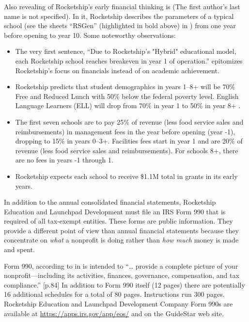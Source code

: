 Also revealing of Rocketship's early financial thinking is  \parencite{FinNarr2010} (The first author's last name is not specified). In it, Rocketship describes the parameters of a typical school (see the sheets ``RSGen'' (highlighted in bold above) in \textcite{RSED2009a}) from one year before opening to year 10. Some noteworthy observations:
\begin{itemize}
  \item The very first sentence, ``Due to Rocketship's "Hybrid" educational model, each Rocketship school reaches breakeven in year 1 of operation.'' \parencite[1]{FinNarr2010} epitomizes Rocketship's focus on financials instead of on academic achievement.
  \item Rocketship predicts that student demographics in years 1–8+ will be 70\% Free and Reduced Lunch with 50\% below the federal poverty level. English Language Learners (ELL) will drop from 70\% in year 1 to 50\% in year 8+ \parencite[1]{FinNarr2010}.
  \item The first seven schools are to pay 25\% of revenue (less food service sales and reimbursements) in management fees in the year before opening (year -1), dropping to 15\% in years 0–3+. Facilities fees start in year 1 and are 20\% of revenue (less food service sales and reimbursements). For schools 8+, there are no fees in years -1 through 1.\parencite[6]{FinNarr2010}

  \item Rocketship expects each school to receive \$1.1M total in grants in its early years.
\end{itemize}

In addition to the annual consolidated financial statements, Rocketship Education and Launchpad Development must file an IRS Form 990 that is required of all tax-exempt entities. These forms are public information. They provide a different point of view than annual financial statements because they concentrate on \textit{what} a nonprofit is doing rather than \textit{how much} money is made and spent.

Form 990, according to  in  is intended to ``\ldots{} provide a complete picture of your nonprofit—including its activities, finances, governance, compensation, and tax compliance.'' [p.84] In addition to Form 990 itself (12 pages) there are potentially 16 additional schedules for a total of 80 pages. Instructions run 300 pages. Rocketship Education and Launchpad Development Company Form 990s are available at \url{https://apps.irs.gov/app/eos/} and on the GuideStar web site.

